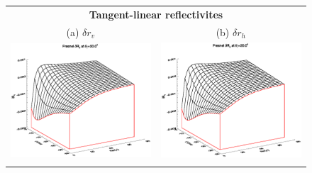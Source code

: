\begin{figure}[htp]
  \centering
  \begin{tabular}{c c}
    \multicolumn{2}{c}{\sffamily\textbf{Tangent-linear reflectivites}}\\
    \textsf{(a)} $\delta r_v$ &
    \textsf{(b)} $\delta r_h$ \\
    \includegraphics[bb=120 240 508 540,clip,scale=0.5]{graphics/Fresnel/TLAD/rv_TL_z20.0.eps} &
    \includegraphics[bb=120 240 508 540,clip,scale=0.5]{graphics/Fresnel/TLAD/rv_TL_z20.0.eps} \\\\

\end{tabular}
\end{figure}
